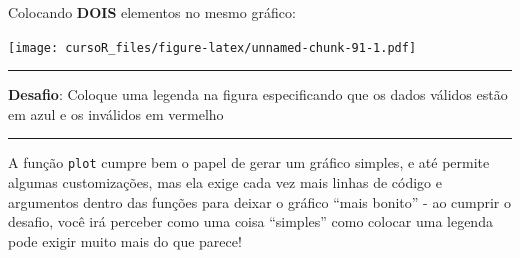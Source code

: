 \documentclass[]{book}
\newenvironment{Shaded}{\begin{snugshade}}{\end{snugshade}}
\newcommand{\KeywordTok}[1]{\textcolor[rgb]{0.13,0.29,0.53}{\textbf{#1}}}
\newcommand{\DataTypeTok}[1]{\textcolor[rgb]{0.13,0.29,0.53}{#1}}
\newcommand{\DecValTok}[1]{\textcolor[rgb]{0.00,0.00,0.81}{#1}}
\newcommand{\StringTok}[1]{\textcolor[rgb]{0.31,0.60,0.02}{#1}}
\newcommand{\CommentTok}[1]{\textcolor[rgb]{0.56,0.35,0.01}{\textit{#1}}}
\newcommand{\OperatorTok}[1]{\textcolor[rgb]{0.81,0.36,0.00}{\textbf{#1}}}
\newcommand{\NormalTok}[1]{#1}
\theoremstyle{definition}
\theoremstyle{definition}
\theoremstyle{definition}
\theoremstyle{remark}
\begin{document}
Colocando \textbf{DOIS} elementos no mesmo gráfico:

\begin{Shaded}
\end{Shaded}

\texttt{[image: cursoR\_files/figure-latex/unnamed-chunk-91-1.pdf]}

\begin{center}\rule{0.5\linewidth}{\linethickness}\end{center}

{\textbf{Desafio}: Coloque uma legenda na figura especificando que os
dados válidos estão em azul e os inválidos em vermelho }

\begin{center}\rule{0.5\linewidth}{\linethickness}\end{center}

A função \texttt{plot} cumpre bem o papel de gerar um gráfico simples, e
até permite algumas customizações, mas ela exige cada vez mais linhas de
código e argumentos dentro das funções para deixar o gráfico ``mais
bonito'' - ao cumprir o desafio, você irá perceber como uma coisa
``simples'' como colocar uma legenda pode exigir muito mais do que
parece!
\end{document}
